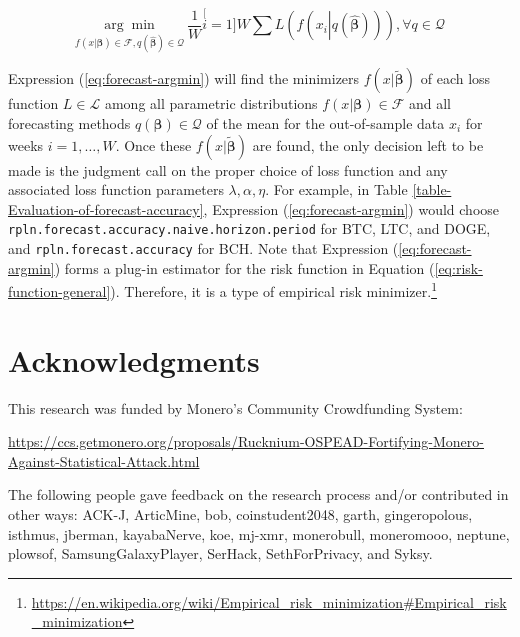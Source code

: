 \documentclass[english]{article}
\begin{document}
\begin{equation}
\underset{f(x|\boldsymbol{\beta})\in\mathcal{F},q\left(\hat{\boldsymbol{\beta}}\right)\in\mathcal{Q}}{\arg\min}\:\dfrac{1}{W}\stackrel[i=1]{W}{\sum}L\left(f\left(x_{i}\left|q\left(\hat{\boldsymbol{\beta}}\right)\right.\right)\right),\forall q\in\mathcal{Q}\label{eq:forecast-argmin}
\end{equation}

Expression (\ref{eq:forecast-argmin}) will find the minimizers $f(x|\tilde{\boldsymbol{\beta}})$
of each loss function $L\in\mathcal{L}$ among all parametric distributions
$f(x|\boldsymbol{\beta})\in\mathcal{F}$ and all forecasting methods
$q(\boldsymbol{\beta})\in\mathcal{Q}$ of the mean for the out-of-sample
data $x_{i}$ for weeks $i=1,\dots,W$. Once these $f(x|\tilde{\boldsymbol{\beta}})$
are found, the only decision left to be made is the judgment call
on the proper choice of loss function and any associated loss function
parameters $\lambda,\alpha,\eta$. For example, in Table \ref{table-Evaluation-of-forecast-accuracy},
Expression (\ref{eq:forecast-argmin}) would choose \texttt{rpln.forecast.accuracy.naive.horizon.period}
for BTC, LTC, and DOGE, and \texttt{rpln.forecast.accuracy} for BCH.
Note that Expression (\ref{eq:forecast-argmin}) forms a plug-in estimator
for the risk function in Equation (\ref{eq:risk-function-general}).
Therefore, it is a type of empirical risk minimizer.\footnote{\href{https://en.wikipedia.org/wiki/Empirical_risk_minimization\#Empirical_risk_minimization}{https://en.wikipedia.org/wiki/Empirical\_risk\_minimization\#Empirical\_risk\_minimization}}

\section{Acknowledgments\label{sec:Acknowledgments}}

This research was funded by Monero's Community Crowdfunding System: 

\href{https://ccs.getmonero.org/proposals/Rucknium-OSPEAD-Fortifying-Monero-Against-Statistical-Attack.html}{https://ccs.getmonero.org/proposals/Rucknium-OSPEAD-Fortifying-Monero-Against-Statistical-Attack.html}

The following people gave feedback on the research process and/or
contributed in other ways: ACK-J, ArticMine, bob, coinstudent2048,
garth, gingeropolous, isthmus, jberman, kayabaNerve, koe, mj-xmr,
monerobull, moneromooo, neptune, plowsof, SamsungGalaxyPlayer, SerHack,
SethForPrivacy, and Syksy.

\pagebreak{}

\begin{singlespace}

\end{singlespace}
\end{document}
